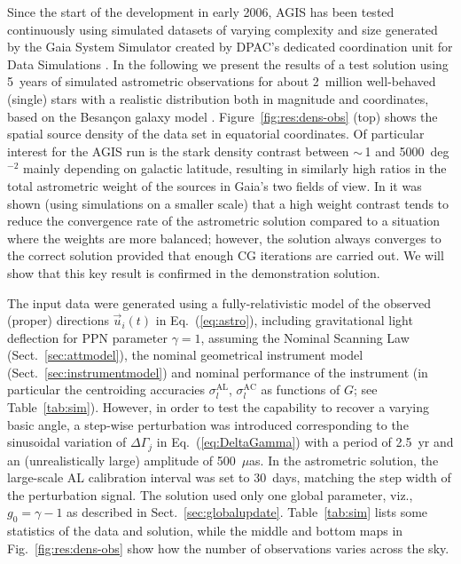 \documentclass[structabstract]{aa}
\begin{document}
Since the start of the development in early 2006, AGIS has been
tested continuously using simulated datasets of varying
complexity and size generated by the Gaia System Simulator
\citep{2005ESASP.576..457M} created by DPAC's dedicated coordination 
unit for Data Simulations \citep[CU2;][]{iaus248:FM,2011EAS....45...25L}. 
In the following we present the results of a test solution using 5~years of
simulated astrometric observations for about 2~million well-behaved (single) 
stars with a realistic distribution both in magnitude and coordinates,
based on the Besan\c{c}on galaxy model \citep{robin2003}.
Figure~\ref{fig:res:dens-obs} (top) shows the spatial source density of the
data set in equatorial coordinates. Of particular interest for the
AGIS run is the stark density contrast between $\sim\,$1 and 5000~deg$^{-2}$
mainly depending on galactic latitude, resulting in similarly high ratios in
the total astrometric weight of the sources in Gaia's two fields of view.
In \citet{bombrun+10} it was shown (using simulations on a smaller scale)
that a high weight contrast tends to reduce the convergence rate of the
astrometric solution compared to a situation where
the weights are more balanced; however, the solution always converges
to the correct solution provided that enough CG iterations are carried out.
We will show that this key result is confirmed in the demonstration solution.

The input data were generated using a fully-relativistic model of the observed
(proper) directions $\vec{u}_i(t)$ in Eq.~(\ref{eq:astro}), including gravitational
light deflection for PPN parameter $\gamma=1$, assuming the Nominal Scanning Law
(Sect.~\ref{sec:attmodel}), the nominal geometrical instrument model 
(Sect.~\ref{sec:instrumentmodel}) and nominal performance of the instrument 
(in particular the centroiding accuracies $\sigma_l^\text{AL}$, $\sigma_l^\text{AC}$ 
as functions of $G$; see Table~\ref{tab:sim}). However, in order to
test the capability to recover a varying basic angle, a step-wise perturbation 
was introduced corresponding to the sinusoidal variation of 
$\Delta\Gamma_j$ in Eq.~(\ref{eq:DeltaGamma}) with a period of 2.5~yr and
an (unrealistically large) amplitude of 500~$\mu$as. In the astrometric solution,
the large-scale AL calibration interval was set to 30~days, matching the step 
width of the perturbation signal. The solution used only one global parameter,
viz., $g_0=\gamma-1$ as described in Sect.~\ref{sec:globalupdate}.
Table~\ref{tab:sim} lists some statistics of the data
and solution, while the middle and bottom maps in Fig.~\ref{fig:res:dens-obs} 
show how the number of observations varies across the sky.
\end{document}
